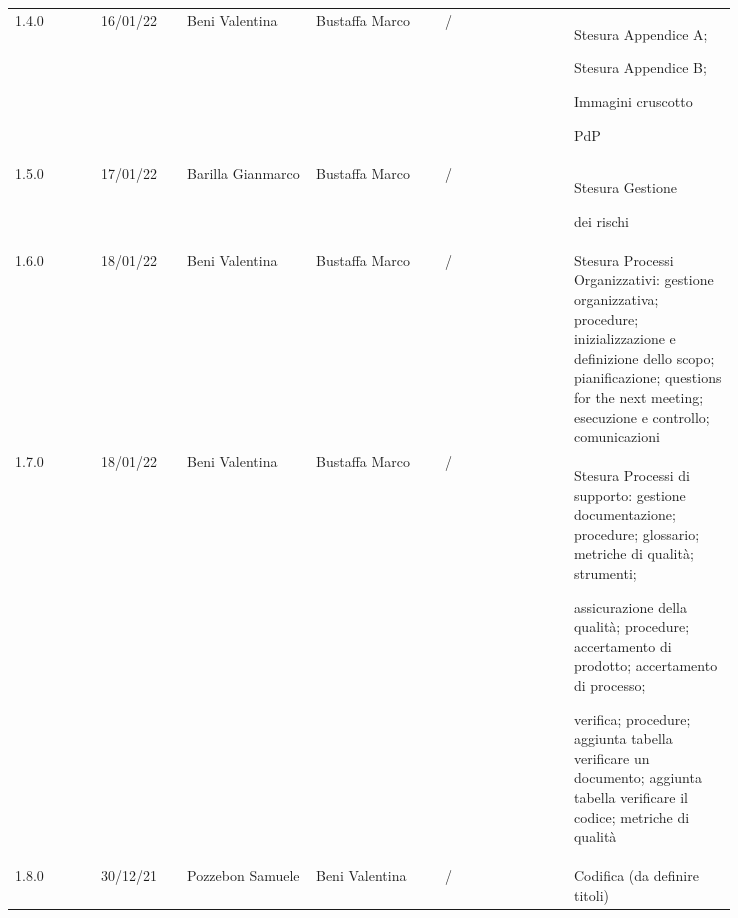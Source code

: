 {\begin{longtable}{p{0.10\linewidth}p{0.10\linewidth}p{0.15\linewidth}p{0.15\linewidth}p{0.15\linewidth}p{0.19\linewidth}}
	\rowcolor[RGB]{233, 245, 206}
	1.4.0 & 16/01/22 & Beni Valentina & Bustaffa Marco & / & Stesura Appendice A; \par Stesura Appendice B; \par Immagini cruscotto \par PdP \\
	\rowcolor[RGB]{216, 235, 171}
	1.5.0 & 17/01/22 & Barilla Gianmarco & Bustaffa Marco & / & Stesura Gestione \par dei rischi \\
	\rowcolor[RGB]{233, 245, 206}
	1.6.0 & 18/01/22 & Beni Valentina & Bustaffa Marco & / & Stesura Processi Organizzativi: gestione organizzativa; procedure; inizializzazione e definizione dello scopo; pianificazione; questions for the next meeting;
	esecuzione e controllo; comunicazioni \\
	\rowcolor[RGB]{216, 235, 171}
	1.7.0 & 18/01/22 & Beni Valentina & Bustaffa Marco & / & Stesura Processi di supporto: gestione documentazione; procedure; glossario; metriche di qualità; strumenti; \par assicurazione della qualità; procedure; accertamento di prodotto; accertamento di processo;
	\par verifica; procedure; aggiunta tabella verificare un documento; aggiunta tabella verificare il codice; metriche di qualità \\
	\rowcolor[RGB]{233, 245, 206}
	1.8.0 & 30/12/21 & Pozzebon Samuele & Beni Valentina & / & Codifica (da definire titoli)\\
\end{longtable}	
}